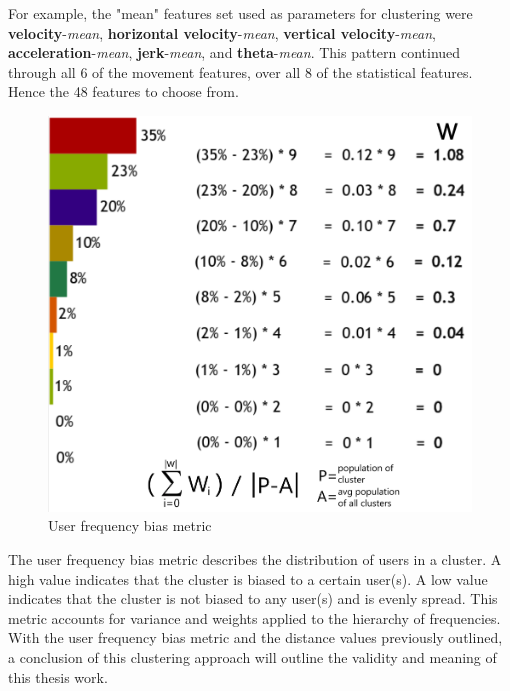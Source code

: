 For example, the "mean" features set used as parameters for clustering were \textbf{velocity}-\textit{mean}, \textbf{horizontal velocity}-\textit{mean}, \textbf{vertical velocity}-\textit{mean}, \textbf{acceleration}-\textit{mean}, \textbf{jerk}-\textit{mean}, and \textbf{theta}-\textit{mean}. This pattern continued through all 6 of the movement features, over all 8 of the statistical features. Hence the 48 features to choose from.

\begin{figure}[h!]
	\includegraphics[width=.8\columnwidth]{figures/user_freq_distribution}

	\caption{User frequency bias metric}
	\label{fig:user_freq_bias_metric}
\end{figure}

The user frequency bias metric describes the distribution of users in a cluster.
A high value indicates that the cluster is biased to a certain user(s).
A low value indicates that the cluster is not biased to any user(s) and is evenly spread. This metric accounts for variance and weights applied to the hierarchy of frequencies.
With the user frequency bias metric and the distance values previously outlined, a conclusion of this clustering approach will outline the validity and meaning of this thesis work.

%
